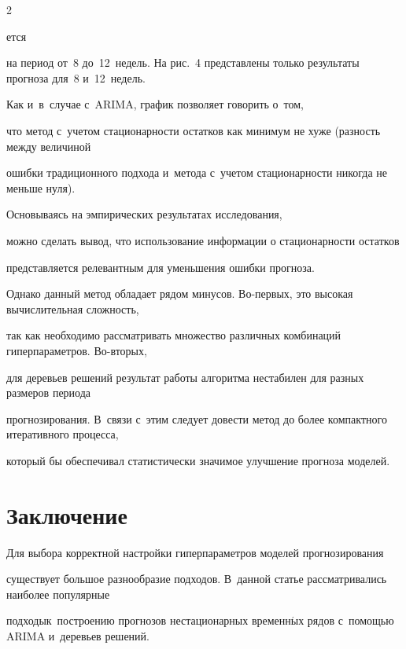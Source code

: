 \begin{multicols}{2}



\noindent

ется

 на период от~8 до~12~недель. На рис.~4 пред\-став\-ле\-ны только результаты прогноза для~8 и~12~недель.

  Как и~в~случае с~\mbox{ARIMA}, график позволяет говорить о~том, 

что метод с~учетом стационарности остатков как минимум не хуже  (разность между величиной 

ошибки традиционного подхода и~метода с~учетом стационарности никогда не меньше нуля).







Основываясь на эмпирических результатах исследования, 

мож\-но сделать вывод, что использование информации о стационарности остатков

 представляется релевантным для уменьшения ошибки прогноза.



Однако данный метод обладает рядом минусов. Во-пер\-вых, это высокая вычислительная слож\-ность, 

так как необходимо рассматривать множество различных комбинаций гиперпараметров. Во-вто\-рых, 

для деревьев решений результат работы алгоритма нестабилен для разных размеров периода 

прогнозирования. В~связи с~этим следует довести метод до более компактного итеративного процесса, 

который бы обеспечивал статистически значимое улучшение прогноза моделей.





\section{Заключение}



Для выбора корректной настройки гиперпараметров моделей прогнозирования 

существует большое разнообразие подходов. В~данной статье рассматривались наиболее популярные 

подходы\linebreak к~построению прогнозов нестационарных вре\-мен\-н$\acute{\mbox{ы}}$х рядов с~по\-мощью \mbox{ARIMA} и~деревьев решений. 


\end{multicols}
